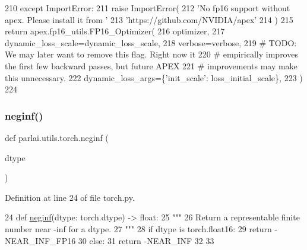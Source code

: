 \begin{DoxyCode}
210     \textcolor{keywordflow}{except} ImportError:
211         \textcolor{keywordflow}{raise} ImportError(
212             \textcolor{stringliteral}{'No fp16 support without apex. Please install it from '}
213             \textcolor{stringliteral}{'https://github.com/NVIDIA/apex'}
214         )
215     \textcolor{keywordflow}{return} apex.fp16\_utils.FP16\_Optimizer(
216         optimizer,
217         dynamic\_loss\_scale=dynamic\_loss\_scale,
218         verbose=verbose,
219         \textcolor{comment}{# TODO: We may later want to remove this flag. Right now it}
220         \textcolor{comment}{# empirically improves the first few backward passes, but future APEX}
221         \textcolor{comment}{# improvements may make this unnecessary.}
222         dynamic\_loss\_args=\{\textcolor{stringliteral}{'init\_scale'}: loss\_initial\_scale\},
223     )
224 \end{DoxyCode}
\mbox{\label{namespaceparlai_1_1utils_1_1torch_a6c6e25115353dba479cd72dc31dc76ae}} 
\subsubsection{\texorpdfstring{neginf()}{neginf()}}
{\footnotesize\ttfamily def parlai.\+utils.\+torch.\+neginf (\begin{DoxyParamCaption}\item[{}]{dtype }\end{DoxyParamCaption})}



Definition at line 24 of file torch.\+py.


\begin{DoxyCode}
24 \textcolor{keyword}{def }\hyperlink{namespaceparlai_1_1utils_1_1torch_a6c6e25115353dba479cd72dc31dc76ae}{neginf}(dtype: torch.dtype) -> float:
25     \textcolor{stringliteral}{"""}
26 \textcolor{stringliteral}{    Return a representable finite number near -inf for a dtype.}
27 \textcolor{stringliteral}{    """}
28     \textcolor{keywordflow}{if} dtype \textcolor{keywordflow}{is} torch.float16:
29         \textcolor{keywordflow}{return} -NEAR\_INF\_FP16
30     \textcolor{keywordflow}{else}:
31         \textcolor{keywordflow}{return} -NEAR\_INF
32 
33 
\end{DoxyCode}
\mbox{\label{namespaceparlai_1_1utils_1_1torch_a1494906187c1ba19f92defb0d4c19ffe}} 

